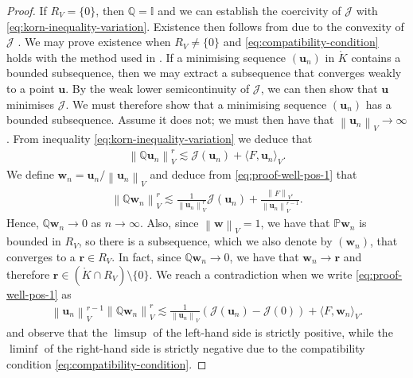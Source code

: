 \documentclass[onefignum,onetabnum]{siamart190516}
\newcommand{\br}{\boldsymbol{r}}
\newcommand{\bu}{\boldsymbol{u}}
\newcommand{\bw}{\boldsymbol{w}}
\newcommand{\bbP}{\mathbb{P}}
\newcommand{\bbQ}{\mathbb{Q}}
\newcommand{\bbI}{\mathbb{I}}
\newcommand{\nrm}[1]{\left\lVert#1\right\rVert}
\newcommand{\Ko}{\mathring{K}}
\newcommand{\Jc}{\mathcal{J}}
\begin{document}
\begin{proof}
	If $R_V = \{0\}$, then $\bbQ = \bbI$ and we can establish the coercivity of $\Jc$ with \eqref{eq:korn-inequality-variation}. Existence then follows from \cite[Theorem 2, Section 8.2]{evans1998} due to the convexity of $\Jc$ \cite{chen2013}. We  may prove existence when $R_V \neq \{0\}$ and \eqref{eq:compatibility-condition} holds with the method used in \cite[1.II]{fichera1973}. If a minimising sequence $(\bu_n)$ in $\Ko$ contains a bounded subsequence, then we may extract a subsequence that converges weakly to a point $\bu$. By the weak lower semicontinuity of $\Jc$, we can then show that $\bu$ minimises $\Jc$. We must therefore show that a minimising sequence $(\bu_n)$ has a bounded subsequence. Assume it does not; we must then have that $\nrm{\bu_n}_V\to\infty$. From inequality \eqref{eq:korn-inequality-variation} we deduce that 
	\begin{align}\label{eq:proof-well-pos-1}
		\nrm{\bbQ\bu_n}^r_V \lesssim \Jc(\bu_n) + \langle F, \bu_n \rangle_V.
	\end{align}
	We define $\bw_n = \bu_n/\nrm{\bu_n}_V$ and deduce from \eqref{eq:proof-well-pos-1} that
	\begin{align*}
		\nrm{\bbQ\bw_n}^r_V \lesssim \frac{1}{\nrm{\bu_n}_V^r} \Jc(\bu_n) + \frac{\nrm{F}_{V^\ast}}{\nrm{\bu_n}^{r-1}_V}.
	\end{align*}	
	Hence, $\bbQ\bw_n\to 0$ as $n\to \infty$. Also, since $\nrm{\bw}_V = 1$, we have that $\bbP \bw_n$ is bounded in $R_V$, so there is a subsequence, which we also denote by $(\bw_n)$, that converges to a $\br\in R_V$. In fact, since $\bbQ\bw_n\to 0$, we have that $\bw_n \to \br$ and therefore $\br \in (\Ko \cap R_V)\setminus \{0\}$. We reach a contradiction when we write \eqref{eq:proof-well-pos-1} as
	\begin{align*}
		\nrm{\bu_n}_V^{r-1}\nrm{\bbQ\bw_n}^r_V \lesssim \frac{1}{\nrm{\bu_n}_V} \left(\Jc(\bu_n) - \Jc(0)\right) + \langle F, \bw_n \rangle_V.
	\end{align*}
	and observe that the $\limsup$ of the left-hand side is strictly positive, while the $\liminf$ of the right-hand side is strictly negative due to the compatibility condition \eqref{eq:compatibility-condition}.
	

\end{proof}
\end{document}
